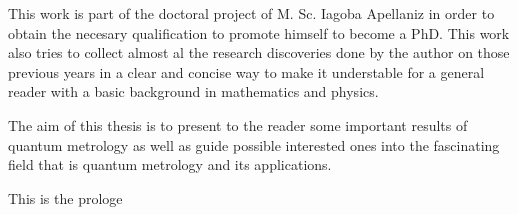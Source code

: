 
This work is part of the doctoral project of M. Sc. Iagoba Apellaniz in order to obtain the necesary qualification to promote himself to become a PhD.
This work also tries to collect almost al the research discoveries done by the author on those previous years in a clear and concise way to make it understable for a general reader with a basic background in mathematics and physics. 

The aim of this thesis is to present to the reader some important results of quantum metrology as well as guide possible interested ones into the fascinating field that is quantum metrology and its applications.

This is the prologe